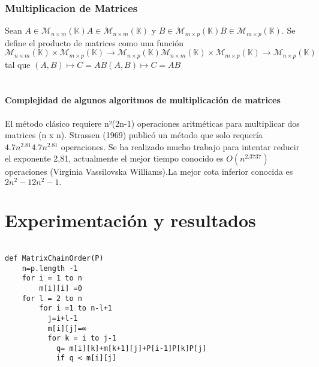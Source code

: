 \documentclass[12pt,twoside]{article}
\begin{document}
\subsubsection{Multiplicacion de Matrices}
Sean ${\displaystyle A\in {\mathcal {M}}_{n\times m}(\mathbb {K} )} A\in {\mathcal  {M}}_{{n\times m}}({\mathbb  {K}})$ y ${\displaystyle B\in {\mathcal {M}}_{m\times p}(\mathbb {K} )} B\in {\mathcal  {M}}_{{m\times p}}({\mathbb  {K}}).$ Se define el producto de matrices como una función ${\displaystyle {\mathcal {M}}_{n\times m}(\mathbb {K} )\times {\mathcal {M}}_{m\times p}(\mathbb {K} )\longrightarrow {\mathcal {M}}_{n\times p}(\mathbb {K} )} {\mathcal  {M}}_{{n\times m}}({\mathbb  {K}})\times {\mathcal  {M}}_{{m\times p}}({\mathbb  {K}})\longrightarrow {\mathcal  {M}}_{{n\times p}}({\mathbb  {K}})$ tal que ${\displaystyle (A,B)\mapsto C=AB} (A,B)\mapsto C=AB$\\
\\\\
\textbf{Complejidad de algunos algoritmos de multiplicación de matrices}
\\\\
El método clásico requiere n²(2n-1) operaciones aritméticas para multiplicar dos matrices (n x n). Strassen (1969) publicó un método que solo requería ${\displaystyle 4.7n^{2.81}} {\displaystyle 4.7n^{2.81}}$ operaciones. Se ha realizado mucho trabajo para  intentar reducir el exponente 2,81, actualmente el mejor tiempo conocido es ${\displaystyle O(n^{2.3737})}$operaciones (Virginia Vassilovska Williams).La mejor cota inferior conocida es ${\displaystyle 2n^{2}-1} {\displaystyle 2n^{2}-1}.$

\section{Experimentación y resultados}

\begin{verbatim}

def MatrixChainOrder(P)
    n=p.length -1
    for i = 1 to n 
        m[i][i] =0
    for l = 2 to n
        for i =1 to n-l+1 
          j=i+l-1
          m[i][j]=∞
          for k = i to j-1
            q= m[i][k]+m[k+1][j]+P[i-1]P[k]P[j]
            if q < m[i][j]
                
\end{verbatim}
\end{document}
